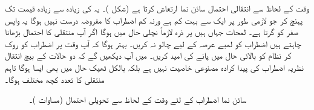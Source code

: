 وقت کے لحاظ سے انتقالی احتمال سائن نما ارتعاش کرتا ہے (شکل )۔ یہ  کی زیادہ سے زیادہ قیمت تک پہنچ کر جو لازمی طور پر ایک   سے بہت کم ہے ورنہ کم اضطراب کا مفروضہ درست نہیں ہوگا یہ واپس صفر کو گرتا ہے۔ لمحات  جہاں  ہیں پر ذرہ لازماً نچلی حال میں ہوگا اگر آپ منتقلی کا احتمال بڑھانا چاہتے ہیں اضطراب کو لمبے عرصہ کے لیے چالو نہ کریں۔ بہتر ہوگا کہ آپ وقت  پر اضطراب کو روک کر نظام کو بالائی حال میں پانے کی امید کریں۔  میں آپ دیکھیں گے کہ دو حالات کے بیچ انتقال نظریہ اضطراب کی پیدا کرادہ  مصنوعی خاصیت  نہیں ہے بلکہ بالکل ٹھیک حال میں بھی ایسا ہوگا تاہم منتقلی کا تعدد کچھ مختلف ہوگا۔

\begin{figure}
\centering
{}
\caption{سائن نما اضطراب کے لئے وقت کے لحاظ سے تحویلی احتمال (مساوات )۔}
\label{شکل_تابع_وقت_احتمال_سائن_نما_احتمال}
\end{figure}


